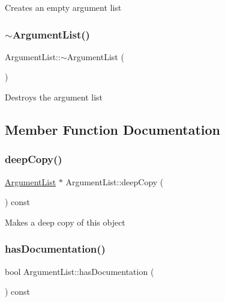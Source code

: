 Creates an empty argument list \mbox{\label{class_argument_list_a208ee05222465738505facb0b24e0380}} 
\subsubsection{\texorpdfstring{$\sim$ArgumentList()}{~ArgumentList()}}
{\footnotesize\ttfamily Argument\+List\+::$\sim$\+Argument\+List (\begin{DoxyParamCaption}{ }\end{DoxyParamCaption})\hspace{0.3cm}{\ttfamily [inline]}}

Destroys the argument list 

\subsection{Member Function Documentation}
\mbox{\label{class_argument_list_a9c87ea86c299ce39b3818548e38f6cad}} 
\subsubsection{\texorpdfstring{deepCopy()}{deepCopy()}}
{\footnotesize\ttfamily \mbox{\hyperlink{class_argument_list}{Argument\+List}} $\ast$ Argument\+List\+::deep\+Copy (\begin{DoxyParamCaption}{ }\end{DoxyParamCaption}) const}

Makes a deep copy of this object \mbox{\label{class_argument_list_a3d2726240dff68120149845452e1d1ec}} 
\subsubsection{\texorpdfstring{hasDocumentation()}{hasDocumentation()}}
{\footnotesize\ttfamily bool Argument\+List\+::has\+Documentation (\begin{DoxyParamCaption}{ }\end{DoxyParamCaption}) const}

